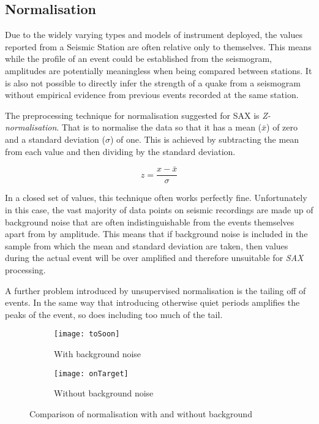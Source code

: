 \documentclass[../report.tex]{subfiles}
\begin{document}
	
\subsection{Normalisation} \label{sec:Z-normalisation}
	Due to the widely varying types and models of instrument deployed, the values reported from a Seismic Station are often relative only to themselves.  This means while the profile of an event could be established from the seismogram, amplitudes are potentially meaningless when being compared between stations.  It is also not possible to directly infer the strength of a quake from a seismogram without empirical evidence from previous events recorded at the same station.

	The preprocessing technique for normalisation suggested for SAX \citep{sax} is \textit{Z-normalisation}.  That is to normalise the data so that it has a mean ($\bar{x}$) of zero and a standard deviation ($\sigma$) of one.  This is achieved by subtracting the mean from each value and then dividing by the standard deviation.
	
	\begin{equation}
	z = \dfrac{x - \bar{x}}{\sigma}
	\end{equation}
	
	In a closed set of values, this technique often works perfectly fine.  Unfortunately in this case, the vast majority of data points on seismic recordings are made up of background noise that are often indistinguishable from the events themselves apart from by amplitude.  This means that if background noise is included in the sample from which the mean and standard deviation are taken, then values during the actual event will be over amplified and therefore unsuitable for \textit{SAX} processing.
	
	A further problem introduced by unsupervised normalisation is the tailing off of events.  In the same way that introducing otherwise quiet periods amplifies the peaks of the event, so does including too much of the tail.
	
\begin{figure}[h]
	\begin{subfigure}{\textwidth}
		\centering
		\texttt{[image: toSoon]}
		\caption[]{With background noise}
	\end{subfigure}
	\begin{subfigure}{\textwidth}
		\centering
		\texttt{[image: onTarget]}
		\caption[]{Without background noise}
	\end{subfigure}
	\caption{Comparison of normalisation with and without background}
	\label{fig:tosoon}
\end{figure}
\end{document}
